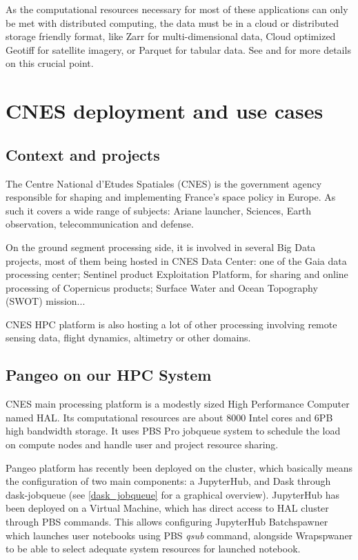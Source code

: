 \documentclass{article}
\begin{document}
As the computational resources necessary for most of these applications can only
be met with distributed computing, the data must be in a cloud or distributed
storage friendly format, like Zarr for multi-dimensional data, Cloud optimized
Geotiff for satellite imagery, or Parquet for tabular data. See \cite{b7} and
\cite{b11} for more details on this crucial point.


\section{CNES deployment and use cases}
\label{sec:cnes}

\subsection{Context and projects}
\label{ssec:context}

The Centre National d'Etudes Spatiales (CNES) is the government agency responsible for shaping and implementing France's space policy in Europe. As such it covers a wide range of subjects: Ariane launcher, Sciences, Earth observation, telecommunication and defense.

On the ground segment processing side, it is involved in several Big Data projects, most of them being hosted in CNES Data Center: one of the Gaia data processing center; Sentinel product Exploitation Platform, for sharing and online processing of Copernicus products; Surface Water and Ocean Topography (SWOT) mission...

CNES HPC platform is also hosting a lot of other processing involving remote sensing data, flight dynamics, altimetry or other domains.

\subsection{Pangeo on our HPC System}
\label{ssec:pangeohpc}

CNES main processing platform is a modestly sized High Performance Computer named HAL. Its computational resources are about 8000 Intel cores and 6PB high bandwidth storage. It uses PBS Pro jobqueue system to schedule the load on compute nodes and handle user and project resource sharing.

Pangeo platform has recently been deployed on the cluster, which basically means the configuration of two main components: a JupyterHub, and Dask through dask-jobqueue (see \ref{dask_jobqueue} for a graphical overview). JupyterHub has been deployed on a Virtual Machine, which has direct access to HAL cluster through PBS commands. This allows configuring JupyterHub Batchspawner which launches user notebooks using PBS \textit{qsub} command, alongside Wrapspwaner to be able to select adequate system resources for launched notebook.
\end{document}
